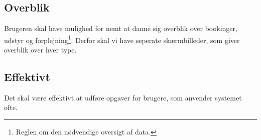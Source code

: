 \subsection{Overblik}
Brugeren skal have mulighed for nemt at danne sig overblik over bookinger, udstyr og forplejning\footnote{Reglen om den nødvendige oversigt af data.}. Derfor skal vi have seperate skærmbilleder, som giver overblik over hver type.

\subsection{Effektivt}
Det skal være effektivt at udføre opgaver for brugere, som anvender systemet ofte.